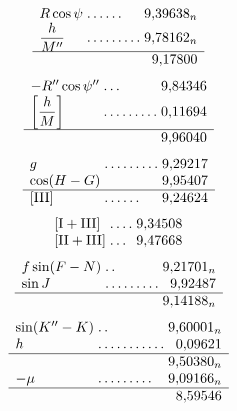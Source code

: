 \[
\begin{array}{l@{\;}l@{\;}r}
R\cos\psi&\mathord{.}\,\mathord{.}\,\mathord{.}\,\mathord{.}\,\mathord{.}\,\mathord{.}&9{,}39638_n\\
\dfrac{h}{M''}&\mathord{.}\,\mathord{.}\,\mathord{.}\,\mathord{.}\,\mathord{.}\,\mathord{.}\,\mathord{.}\,\mathord{.}\,\mathord{.}&9{,}78162_n\\[2pt]\hline
&&9{,}17800
\end{array}
\]
\[
\begin{array}{l@{\;}l@{\;}r}
-R''\cos\psi''&\mathord{.}\,\mathord{.}\,\mathord{.}&9{,}84346\\
\left[\dfrac{h}{M}\right]&\mathord{.}\,\mathord{.}\,\mathord{.}\,\mathord{.}\,\mathord{.}\,\mathord{.}\,\mathord{.}\,\mathord{.}\,\mathord{.}&0{,}11694\\[2pt]\hline
&&9{,}96040
\end{array}
\]
\[
\begin{array}{l@{\;}l@{\;}r}
g&\mathord{.}\,\mathord{.}\,\mathord{.}\,\mathord{.}\,\mathord{.}\,\mathord{.}\,\mathord{.}\,\mathord{.}\,\mathord{.}&9{,}29217\\
\cos(H-G)&&9{,}95407\\\hline
[\mathrm{III}]&\mathord{.}\,\mathord{.}\,\mathord{.}\,\mathord{.}\,\mathord{.}\,\mathord{.}&9{,}24624
\end{array}
\]
\[
\begin{array}{l@{\;}l@{\;}r}
[\mathrm{I}+\mathrm{III}]&\mathord{.}\,\mathord{.}\,\mathord{.}\,\mathord{.}&9{,}34508\\
{}[\mathrm{II}+\mathrm{III}]&\mathord{.}\,\mathord{.}\,\mathord{.}&9{,}47668
\end{array}
\]
\[
\begin{array}{l@{\;}l@{\;}r}
f\sin(F-N)&\mathord{.}\,\mathord{.}&9{,}21701_n\\
\sin J&\mathord{.}\,\mathord{.}\,\mathord{.}\,\mathord{.}\,\mathord{.}\,\mathord{.}\,\mathord{.}\,\mathord{.}\,\mathord{.}&9{,}92487\\\hline
&&9{,}14188_n
\end{array}
\]
\[
\begin{array}{l@{\;}l@{\;}r}
\sin(K''-K)&\mathord{.}\,\mathord{.}&9{,}60001_n\\
h&\mathord{.}\,\mathord{.}\,\mathord{.}\,\mathord{.}\,\mathord{.}\,\mathord{.}\,\mathord{.}\,\mathord{.}\,\mathord{.}\,\mathord{.}\,\mathord{.}&0{,}09621\\\hline
&&9{,}50380_n\\
-\mu&\mathord{.}\,\mathord{.}\,\mathord{.}\,\mathord{.}\,\mathord{.}\,\mathord{.}\,\mathord{.}\,\mathord{.}\,\mathord{.}&9{,}09166_n\\\hline
&&8{,}59546
\end{array}
\]
